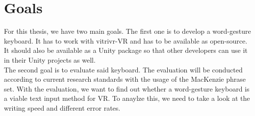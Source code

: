 \section{Goals}
For this thesis, we have two main goals. The first one is to develop a word-gesture keyboard. It has to work with vitrivr-VR and has to be available as open-source. It should also be available as a Unity package so that other developers can use it in their Unity projects as well.\\
The second goal is to evaluate said keyboard. The evaluation will be conducted according to current research standards with the usage of the MacKenzie phrase set. With the evaluation, we want to find out whether a word-gesture keyboard is a viable text input method for VR. To anaylze this, we need to take a look at the writing speed and different error rates.